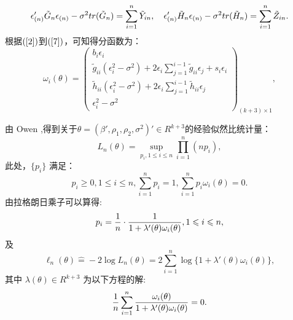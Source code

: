 \documentclass[a4paper,c5size,onecolumn,twoside,cap,Chinese]{APSart}
\begin{document}
\begin{equation}
   \epsilon_{(n)}'\tilde{G}_n\epsilon_{(n)}-\sigma^{2}tr(\tilde{G}_n)=\sum_{i=1}^{n} \tilde{Y}_{in}, \quad \epsilon_{(n)}'\tilde{H}_n\epsilon_{(n)}-\sigma^{2}tr(\tilde{H}_n)=\sum_{i=1}^{n} \tilde{Z}_{in} .\label{7}\\
\end{equation}
根据$\rm(\ref{2}) $到$\rm(\ref{7}) $，可知得分函数为：
$$
\omega_i(\theta)=\left ( 
	\begin{array}{cccc} 
		b_i\epsilon_i\\
		\tilde{g}_{ii} (\epsilon_i^2-\sigma^2 ) + 2\epsilon_i\sum_{j=1}^{i-1} \tilde{g}_{ii}\epsilon_j + s_i\epsilon_i\\
		\tilde{h}_{ii} (\epsilon_i^2-\sigma^2 )+2\epsilon_i\sum_{j=1}^{i-1} \tilde{h}_{ii}\epsilon_j\\
		\epsilon_i^2-\sigma^2
	\end{array} \right)_{(k+3)\times1},
$$

由 Owen ,得到关于$\theta=(\beta', \rho_1,\rho_2,\sigma^2)'\in R^{k+3}$的经验似然比统计量：
$$L_n(\theta)=\sup_{p_i, 1\leq i\leq n} \prod^n_{i=1}(np_i) , $$
此处，$\{p_i\}$ 满足：
$$p_i\geq 0, 1\leq i\leq n,  \sum^n_{i=1}p_i =1,  \sum^n_{i=1}p_i \omega_i(\theta)=0.$$
由拉格朗日乘子可以算得:
$$ p_i ={ 1\over n}\cdot{1 \over 1+\lambda'(\theta)\omega_i(\theta)}, 1\leq i\leq n,$$
及
$$\ell_n(\theta)  \hat{=} -2\log L_n(\theta)=2\sum^n_{i=1}\log \{1+\lambda'(\theta)\omega_i(\theta)\},$$
其中 $\lambda(\theta)\in R^{k+3}$ 为以下方程的解:
\begin{equation}
{1\over n}\sum^n_{i=1}{\omega_i(\theta)\over 1+\lambda'(\theta)\omega_i(\theta)}=0.  \label{eq} 
\end{equation}
\end{document}
